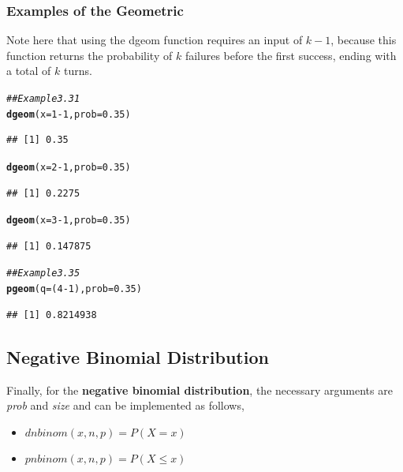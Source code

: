 \documentclass{report}\usepackage[]{graphicx}\usepackage[]{color}
\makeatletter
\newcommand{\hlnum}[1]{\textcolor[rgb]{0.686,0.059,0.569}{#1}}%
\newcommand{\hlcom}[1]{\textcolor[rgb]{0.678,0.584,0.686}{\textit{#1}}}%
\newcommand{\hlopt}[1]{\textcolor[rgb]{0,0,0}{#1}}%
\newcommand{\hlstd}[1]{\textcolor[rgb]{0.345,0.345,0.345}{#1}}%
\newcommand{\hlkwc}[1]{\textcolor[rgb]{0.333,0.667,0.333}{#1}}%
\newcommand{\hlkwd}[1]{\textcolor[rgb]{0.737,0.353,0.396}{\textbf{#1}}}%
\newenvironment{kframe}{%
 \def\at@end@of@kframe{}%
 \ifinner\ifhmode%
  \def\at@end@of@kframe{\end{minipage}}%
  \begin{minipage}{\columnwidth}%
 \fi\fi%
 \def\FrameCommand##1{\hskip\@totalleftmargin \hskip-\fboxsep
 \colorbox{shadecolor}{##1}\hskip-\fboxsep
     \hskip-\linewidth \hskip-\@totalleftmargin \hskip\columnwidth}%
 \MakeFramed {\advance\hsize-\width
   \@totalleftmargin\z@ \linewidth\hsize
   \@setminipage}}%
 {\par\unskip\endMakeFramed%
 \at@end@of@kframe}
\newenvironment{knitrout}{}{} %
\makeatother
\begin{document}
\subsubsection{Examples of the Geometric}
Note here that using the dgeom function requires an input of $k-1$, because this function returns the probability of $k$ failures before the first success, ending with a total of $k$ turns.  
\begin{knitrout}
\color{fgcolor}\begin{kframe}
\begin{alltt}
\hlcom{## Example 3.31}
\hlkwd{dgeom}\hlstd{(}\hlkwc{x} \hlstd{=} \hlnum{1}\hlopt{-}\hlnum{1}\hlstd{,} \hlkwc{prob} \hlstd{=} \hlnum{0.35}\hlstd{)}
\end{alltt}
\begin{verbatim}
## [1] 0.35
\end{verbatim}
\begin{alltt}
\hlkwd{dgeom}\hlstd{(}\hlkwc{x} \hlstd{=} \hlnum{2}\hlopt{-}\hlnum{1}\hlstd{,} \hlkwc{prob} \hlstd{=} \hlnum{0.35}\hlstd{)}
\end{alltt}
\begin{verbatim}
## [1] 0.2275
\end{verbatim}
\begin{alltt}
\hlkwd{dgeom}\hlstd{(}\hlkwc{x} \hlstd{=} \hlnum{3}\hlopt{-}\hlnum{1}\hlstd{,} \hlkwc{prob} \hlstd{=} \hlnum{0.35}\hlstd{)}
\end{alltt}
\begin{verbatim}
## [1] 0.147875
\end{verbatim}
\end{kframe}
\end{knitrout}

\begin{knitrout}
\color{fgcolor}\begin{kframe}
\begin{alltt}
\hlcom{## Example 3.35}
\hlkwd{pgeom}\hlstd{(}\hlkwc{q} \hlstd{= (}\hlnum{4}\hlopt{-}\hlnum{1}\hlstd{),} \hlkwc{prob} \hlstd{=} \hlnum{0.35}\hlstd{)}
\end{alltt}
\begin{verbatim}
## [1] 0.8214938
\end{verbatim}
\end{kframe}
\end{knitrout}

\subsection{Negative Binomial Distribution}
Finally, for the \textbf{negative binomial distribution}, the necessary arguments are \textit{prob} and \textit{size} and can be implemented as follows, 
\begin{itemize} 
\item $dnbinom(x,n,p) = P(X = x)$ 
\item $pnbinom(x,n,p) = P(X \leq x)$ 
\end{itemize}
\end{document}
